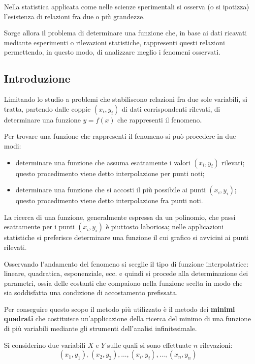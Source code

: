 Nella statistica applicata come nelle scienze sperimentali si osserva (o si ipotizza) l’esistenza di relazioni fra due o più grandezze.

Sorge allora il problema di determinare una funzione che, in base ai dati ricavati mediante esperimenti o rilevazioni statistiche, rappresenti questi relazioni permettendo, in questo modo, di analizzare meglio i fenomeni osservati.

\subsection{Introduzione}\label{ssec:regressione-introduzione}
Limitando lo studio a problemi che stabiliscono relazioni fra due sole variabili, si tratta, partendo dalle coppie $(x_i, y_i)$ di dati corrispondenti rilevati, di determinare una funzione $y=f(x)$ che rappresenti il fenomeno.

Per trovare una funzione che rappresenti il fenomeno si può procedere in due modi:

\begin{itemize}
  \item determinare una funzione che assuma esattamente i valori $(x_i, y_i)$ rilevati; questo procedimento viene detto interpolazione per punti noti;
  \item determinare una funzione che si accosti il più possibile ai punti $(x_i, y_i)$; questo procedimento viene detto interpolazione fra punti noti.
\end{itemize}

La ricerca di una funzione, generalmente espressa da un polinomio, che passi esattamente per i punti $(x_i, y_i)$ è piuttosto laboriosa; nelle applicazioni statistiche si preferisce determinare una funzione il cui grafico si avvicini ai punti rilevati.

Osservando l’andamento del fenomeno si sceglie il tipo di funzione interpolatrice: lineare, quadratica, esponenziale, ecc. e quindi si procede alla determinazione dei parametri, ossia delle costanti che compaiono nella funzione scelta in modo che sia soddisfatta una condizione di accostamento prefissata.

Per conseguire questo scopo il metodo più utilizzato è il metodo dei \textbf{minimi quadrati} che costituisce un’applicazione della ricerca del minimo di una funzione di più variabili mediante gli strumenti dell’analisi infinitesimale.

Si considerino due variabili $X$ e $Y$ sulle quali si sono effettuate $n$ rilevazioni: $$\left(x_{1}, y_{1}\right),\left(x_{2}, y_{2}\right), \ldots,\left(x_{i}, y_{i}\right), \ldots,\left(x_{n}, y_{n}\right)$$

